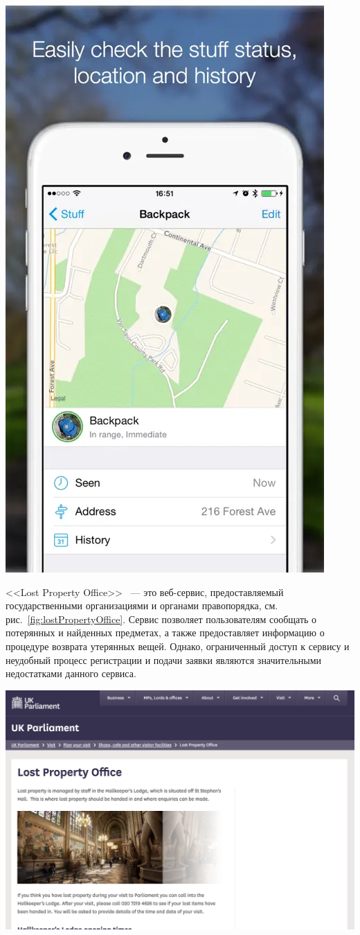 \documentclass{mirea-article}
\newenvironment{Figure}
{\par\medskip\noindent\minipage{\linewidth}}
{\endminipage\par\medskip}
\begin{document}
\begin{multicols}{2}
		\begin{Figure}
			\centering
			\includegraphics[width=.5\textwidth]{../images/findMyStuff1.png}
			\label{fig:findMyStuff1}
		\end{Figure}
		
		<<Lost Property Office>>~\cite{bib:parliament_lost_and_found} --- это веб-сервис, предоставляемый государственными организациями и органами правопорядка, см. рис.~\ref{fig:lostPropertyOffice}. Сервис позволяет пользователям сообщать о потерянных и найденных предметах, а также предоставляет информацию о процедуре возврата утерянных вещей. Однако, ограниченный доступ к сервису и неудобный процесс регистрации и подачи заявки являются значительными недостатками данного сервиса.
		
		\begin{Figure}
			\centering
			\includegraphics[width=.95\textwidth]{../images/lostPropertyOffice}
			\label{fig:lostPropertyOffice}
		\end{Figure}
		

\end{multicols}
\end{document}
